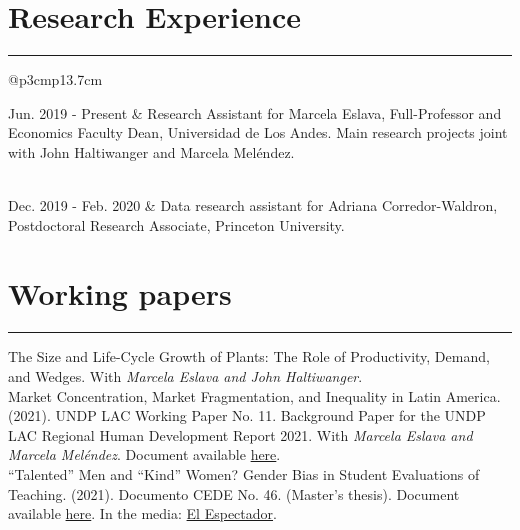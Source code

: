 \documentclass[12pt, letterpaper]{article}
\begin{document}
\section*{Research Experience}
\vspace*{-8mm}
\noindent \rule{\linewidth}{0.2mm}
\noindent
\begin{tabular}{@{}p{3cm}p{13.7cm}}
\raggedright{Jun. 2019 - Present} &  Research Assistant for Marcela Eslava, Full-Professor and Economics Faculty Dean, Universidad de Los Andes. Main research projects joint with John Haltiwanger and Marcela Meléndez.  \\ 
\\ [-3mm]
\raggedright{Dec. 2019 - \newline Feb. 2020} & Data research assistant for Adriana Corredor-Waldron, Postdoctoral Research Associate, Princeton University.
\end{tabular}

\vspace*{-2mm}

\section*{Working papers}
\vspace*{-8mm}
\noindent \rule{\linewidth}{0.2mm}
\noindent The Size and Life-Cycle Growth of Plants: The Role of Productivity, Demand, and Wedges.  With \textit{Marcela Eslava and John Haltiwanger}. \\ [-3mm] %

\noindent Market Concentration, Market Fragmentation, and Inequality in Latin America. (2021). UNDP LAC Working Paper No. 11. Background Paper for the UNDP LAC Regional Human Development Report 2021.  With \textit{Marcela Eslava and Marcela Meléndez}. Document available \href{https://www.latinamerica.undp.org/content/rblac/en/home/library/poverty/market-concentration--market-fragmentation--and-inequality-in-la.html}{here}. \\ [-3mm]

\noindent ``Talented'' Men and ``Kind'' Women? Gender Bias in Student Evaluations of Teaching. (2021). Documento CEDE No. 46. (Master's thesis). Document available \href{https://papers.ssrn.com/sol3/papers.cfm?abstract_id=3919797}{here}. In the media: \href{https://www.elespectador.com/educacion/los-profes-crack-y-las-profes-amables-el-sesgo-de-genero-en-las-aulas/}{El Espectador}.
\end{document}
